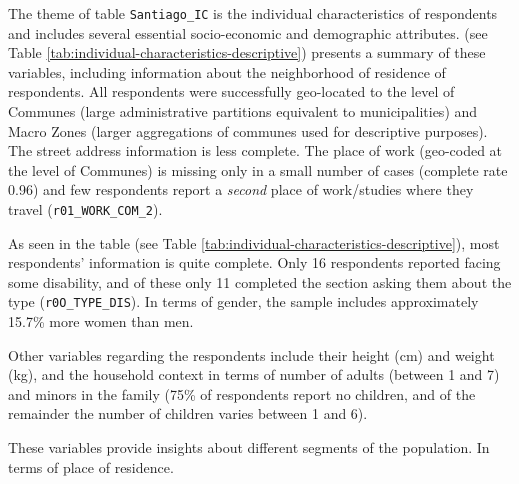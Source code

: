 \documentclass[
11pt, %
oneside, %
english, %
singlespacing, %
]{macthesis} %
\begin{document}
The theme of table \texttt{Santiago\_IC} is the individual characteristics of respondents and includes several essential socio-economic and demographic attributes. (see Table \ref{tab:individual-characteristics-descriptive}) presents a summary of these variables, including information about the neighborhood of residence of respondents. All respondents were successfully geo-located to the level of Communes (large administrative partitions equivalent to municipalities) and Macro Zones (larger aggregations of communes used for descriptive purposes). The street address information is less complete. The place of work (geo-coded at the level of Communes) is missing only in a small number of cases (complete rate 0.96) and few respondents report a \emph{second} place of work/studies where they travel (\texttt{r01\_WORK\_COM\_2}).

As seen in the table (see Table \ref{tab:individual-characteristics-descriptive}), most respondents' information is quite complete. Only 16 respondents reported facing some disability, and of these only 11 completed the section asking them about the type (\texttt{r0O\_TYPE\_DIS}). In terms of gender, the sample includes approximately 15.7\% more women than men.

Other variables regarding the respondents include their height (cm) and weight (kg), and the household context in terms of number of adults (between 1 and 7) and minors in the family (75\% of respondents report no children, and of the remainder the number of children varies between 1 and 6).

These variables provide insights about different segments of the population. In terms of place of residence.
\end{document}
